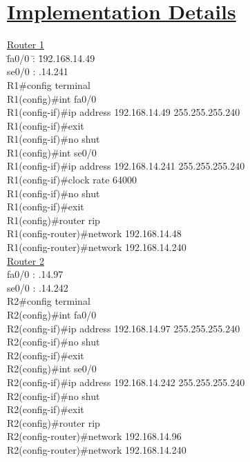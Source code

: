 \documentclass[a4paper]{report}
\begin{document}
    \section*{\underline{Implementation Details}}
    \begin{ttfamily}
        \begin{tabbing}
            \underline{Router 1}\\[5pt]
            \hspace{1cm} \= fa0/0 \quad\= : \quad\= 192.168.14.49\\
            \> se0/0 \> : .14.241\\[5pt]
            \> R1\#config terminal\\
            \> R1(config)\#int fa0/0\\
            \> R1(config-if)\#ip address 192.168.14.49 255.255.255.240\\
            \> R1(config-if)\#exit\\
            \> R1(config-if)\#no shut\\
            \> R1(config)\#int se0/0\\
            \> R1(config-if)\#ip address 192.168.14.241 255.255.255.240\\
            \> R1(config-if)\#clock rate 64000\\
            \> R1(config-if)\#no shut\\
            \> R1(config-if)\#exit\\
            \> R1(config)\#router rip\\
            \> R1(config-router)\#network 192.168.14.48\\
            \> R1(config-router)\#network 192.168.14.240\\[25pt]

            \underline{Router 2}\\[5pt]
            \> fa0/0 \> : .14.97\\
            \> se0/0 \> : .14.242\\[5pt]
            \> R2\#config terminal\\
            \> R2(config)\#int fa0/0\\
            \> R2(config-if)\#ip address 192.168.14.97 255.255.255.240\\
            \> R2(config-if)\#no shut\\
            \> R2(config-if)\#exit\\
            \> R2(config)\#int se0/0\\
            \> R2(config-if)\#ip address 192.168.14.242 255.255.255.240\\
            \> R2(config-if)\#no shut\\
            \> R2(config-if)\#exit\\
            \> R2(config)\#router rip\\
            \> R2(config-router)\#network 192.168.14.96\\
            \> R2(config-router)\#network 192.168.14.240\\
        \end{tabbing}
    \end{ttfamily}
\end{document}
